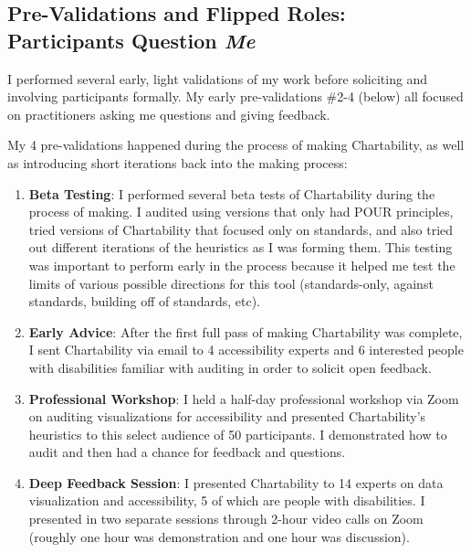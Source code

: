 \documentclass[12pt]{cmuthesis}
\begin{document}
\subsection{Pre-Validations and Flipped Roles: Participants Question \emph{Me}}

I performed several early, light validations of my work before soliciting and involving participants formally. My early pre-validations \#2-4 (below) all focused on practitioners asking me questions and giving feedback. 

My 4 pre-validations happened during the process of making Chartability, as well as introducing short iterations back into the making process: 

\begin{enumerate}
    \item \textbf{Beta Testing}: I performed several beta tests of Chartability during the process of making. I audited using versions that only had POUR principles, tried versions of Chartability that focused only on standards, and also tried out different iterations of the heuristics as I was forming them. This testing was important to perform early in the process because it helped me test the limits of various possible directions for this tool (standards-only, against standards, building off of standards, etc).
    \item \textbf{Early Advice}: After the first full pass of making Chartability was complete, I sent Chartability via email to 4 accessibility experts and 6 interested people with disabilities familiar with auditing in order to solicit open feedback. 
    \item \textbf{Professional Workshop}: I held a half-day professional workshop via Zoom on auditing visualizations for accessibility and presented Chartability’s heuristics to this select audience of 50 participants. I demonstrated how to audit and then had a chance for feedback and questions.
    \item \textbf{Deep Feedback Session}: I presented Chartability to 14 experts on data visualization and accessibility, 5 of which are people with disabilities. I presented in two separate sessions through 2-hour video calls on Zoom (roughly one hour was demonstration and one hour was discussion). 
\end{enumerate}
\end{document}
